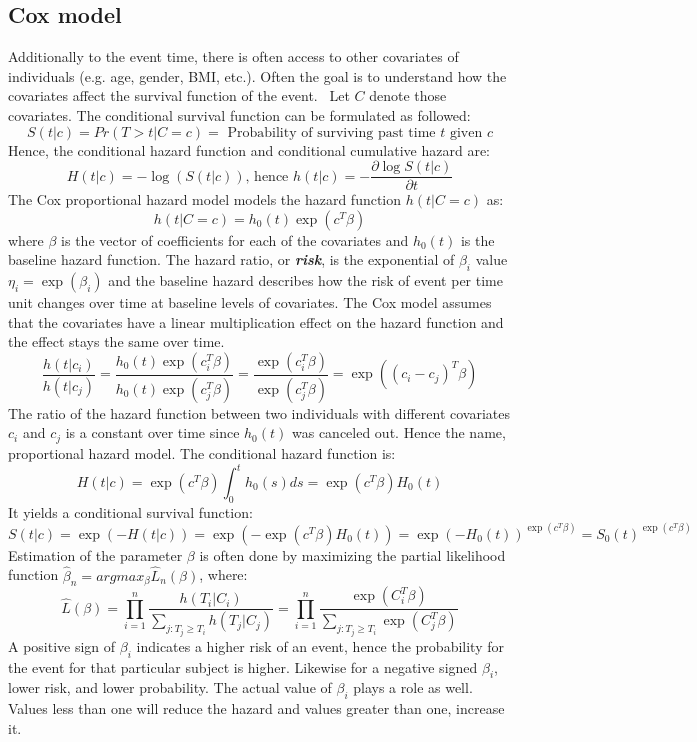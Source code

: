 \subsection{Cox model}
Additionally to the event time, there is often access to other covariates
of individuals (e.g. age, gender, BMI, etc.). Often the goal is to understand how the covariates affect
the survival function of the event.~\cite{STAT_425}
Let $C$ denote those covariates. The conditional survival function can be formulated
as followed:
$$S(t|c) = Pr(T>t|C=c) = \textrm{ Probability of surviving past time } t \textrm{ given } c$$
Hence, the conditional hazard function and conditional cumulative hazard are:
$$ H(t|c) = - \log (S(t|c)) \textrm{, hence } h(t|c) = -\frac{\partial \log S(t|c)}{\partial t}$$
The Cox proportional hazard model models the hazard function $h(t|C=c)$ as:
$$h(t|C=c) = h_0(t) \exp(c^T \beta)$$
where $\beta$ is the vector of coefficients for each of the covariates and $h_0(t)$ is the baseline hazard
function. The hazard ratio, or \textbf{\textit{risk}}, is the exponential of $\beta_i$ value $\eta_i = \exp(\beta _{i})$ and the baseline hazard describes how the risk of event per time unit changes over time at baseline levels of covariates. The Cox model assumes that the covariates have a linear multiplication effect on the
hazard function and the effect stays the same over time. 
$$\frac{h(t|c_i)}{h(t|c_j)} = \frac{h_0(t) \exp(c_i^T \beta)}{h_0(t) \exp(c_j^T \beta)} = \frac{\exp(c_i^T \beta)}{\exp(c_j^T \beta)} =  \exp((c_i - c_j)^T \beta)$$
The ratio of the hazard function between two individuals with different covariates $c_i$ and
$c_j$ is a constant over time since $h_{0}(t)$  was canceled out. Hence the name, proportional hazard model. The conditional hazard function is:
$$H(t|c) = \exp(c^T \beta) \int_0^t h_0(s) ds = \exp(c^T \beta)H_0(t)$$
It yields a conditional survival function:
$$S(t|c) = \exp (-H(t|c)) = \exp(-\exp(c^T \beta)H_0(t)) = \exp(-H_0(t))^{\exp(c^T \beta)} = S_0(t)^{\exp(c^T \beta)}$$
Estimation of the parameter $\beta$ is often done by maximizing the partial likelihood function $\hat{\beta}_n = argmax_\beta \hat{L}_n(\beta) $, where:
$$ \hat{L}(\beta) = \prod_{i=1}^n \frac{h(T_i|C_i)}{\sum_{j: T_j \geq T_i} h(T_j|C_j)} = \prod_{i=1}^n \frac{\exp(C_i^T \beta)}{\sum_{j: T_j \geq T_i} \exp(C_j^T \beta)}$$
A positive sign of $\beta_i$ indicates a higher risk of an event, hence the probability for the event for that particular subject is higher. Likewise for a negative signed $\beta_i$, lower risk, and lower probability. The actual value of $\beta_i$ plays a role as well. Values less than one will reduce the hazard and values greater than one, increase it.


